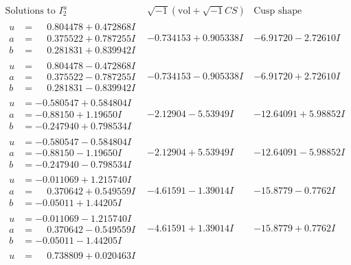 \documentclass[1p]{elsarticle_modified}
\theoremstyle{definition}
\newcommand{\I}{\sqrt{-1}}
\begin{document}
$$\begin{array}{c|c|c}  
\text{Solutions to }I^u_{2}& \I (\text{vol} + \sqrt{-1}CS) & \text{Cusp shape}\\
 \hline 
\begin{aligned}
u &= \phantom{-}0.804478 + 0.472868 I \\
a &= \phantom{-}0.375522 + 0.787255 I \\
b &= \phantom{-}0.281831 + 0.839942 I\end{aligned}
 & -0.734153 + 0.905338 I & -6.91720 - 2.72610 I \\ \hline\begin{aligned}
u &= \phantom{-}0.804478 - 0.472868 I \\
a &= \phantom{-}0.375522 - 0.787255 I \\
b &= \phantom{-}0.281831 - 0.839942 I\end{aligned}
 & -0.734153 - 0.905338 I & -6.91720 + 2.72610 I \\ \hline\begin{aligned}
u &= -0.580547 + 0.584804 I \\
a &= -0.88150 + 1.19650 I \\
b &= -0.247940 + 0.798534 I\end{aligned}
 & -2.12904 - 5.53949 I & -12.64091 + 5.98852 I \\ \hline\begin{aligned}
u &= -0.580547 - 0.584804 I \\
a &= -0.88150 - 1.19650 I \\
b &= -0.247940 - 0.798534 I\end{aligned}
 & -2.12904 + 5.53949 I & -12.64091 - 5.98852 I \\ \hline\begin{aligned}
u &= -0.011069 + 1.215740 I \\
a &= \phantom{-}0.370642 + 0.549559 I \\
b &= -0.05011 + 1.44205 I\end{aligned}
 & -4.61591 - 1.39014 I & -15.8779 - 0.7762 I \\ \hline\begin{aligned}
u &= -0.011069 - 1.215740 I \\
a &= \phantom{-}0.370642 - 0.549559 I \\
b &= -0.05011 - 1.44205 I\end{aligned}
 & -4.61591 + 1.39014 I & -15.8779 + 0.7762 I \\ \hline\begin{aligned}
u &= \phantom{-}0.738809 + 0.020463 I \\

\end{aligned}
\end{array}$$
\end{document}
